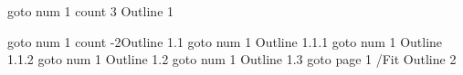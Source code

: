 



\pdfoutline             %
    goto num 1          %
    count 3             %
    {Outline 1}         %

    \pdfoutline goto num 1 count -2{Outline 1.1}
        \pdfoutline goto num 1 {Outline 1.1.1}
        \pdfoutline goto num 1 {Outline 1.1.2}
    \pdfoutline goto num 1 {Outline 1.2}
    \pdfoutline goto num 1 {Outline 1.3}
\pdfoutline goto page 1 {/Fit} {Outline 2}

\newpage


